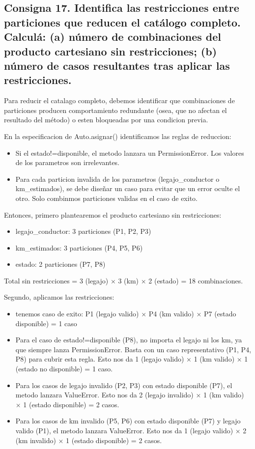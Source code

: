 \subsection{Consigna 17. Identifica las restricciones entre particiones que reducen el catálogo completo. Calculá: (a) número de combinaciones del producto cartesiano sin restricciones; (b) número de casos resultantes tras aplicar las restricciones.}

Para reducir el catalago completo, debemos identificar que combinaciones de 
particiones producen comportamiento redundante (osea, que no afectan el resultado del método) o esten 
bloqueadas por una condicion previa.

En la especificacion de Auto.asignar() identificamos las reglas de reduccion:
\begin{itemize}
    \item Si el estado!=disponible, el metodo lanzara un PermissionError. Los valores de los parametros son irrelevantes.
    \item Para cada particion invalida de los parametros (legajo\_conductor o km\_estimados), se debe diseñar un caso para evitar que un error oculte el otro. Solo combinmos particiones validas en el caso de exito.
    
\end{itemize}


Entonces, primero plantearemos el producto cartesiano sin restricciones:
\begin{itemize}
    \item legajo\_conductor: 3 particiones (P1, P2, P3)
    \item km\_estimados: 3 particiones (P4, P5, P6)
    \item estado: 2 particiones (P7, P8)
\end{itemize}

Total sin restricciones = 3 (legajo) × 3 (km) × 2 (estado) = 18 combinaciones.

Segundo, aplicamos las restricciones:
\begin{itemize}
    \item tenemos caso de exito: P1 (legajo valido) × P4 (km valido) × P7 (estado disponible) = 1 caso
    \item Para el caso de estado!=disponible (P8), no importa el legajo ni los km, ya que siempre lanza PermissionError. Basta con un caso representativo (P1, P4, P8) para cubrir esta regla. Esto nos da 1 (legajo valido) × 1 (km valido) × 1 (estado no disponible) = 1 caso.
    \item Para los casos de legajo invalido (P2, P3) con estado disponible (P7), el metodo lanzara ValueError. Esto nos da 2 (legajo invalido) × 1 (km valido) × 1 (estado disponible) = 2 casos.
    \item Para los casos de km invalido (P5, P6) con estado disponible (P7) y legajo valido (P1), el metodo lanzara ValueError. Esto nos da 1 (legajo valido) × 2 (km invalido) × 1 (estado disponible) = 2 casos.

\end{itemize}

